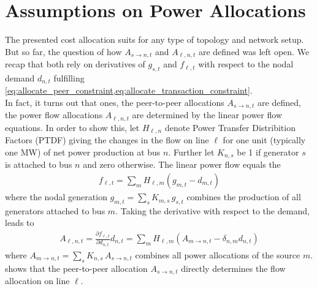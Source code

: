 \documentclass[11pt,twocolumn]{article}
\newcommand{\pdv}[2]{\frac{\partial #1}{\partial #2}}
\newcommand{\generation}{g_{s,t}}
\newcommand{\nodalgeneration}[1][n]{g_{#1,t}}
\newcommand{\demand}[1][n]{d_{#1,t}}
\newcommand{\incidencegenerator}[1][n]{K_{#1,s}}
\newcommand{\ptdf}[1][n]{H_{\ell,#1}}
\newcommand{\flow}{f_{\ell,t}}
\newcommand{\allocatepeer}[1][s \rightarrow n]{A_{#1,t}}
\newcommand{\allocateflow}[1][n]{A_{\ell,#1,t}}
\begin{document}
\section{Assumptions on Power Allocations}
\label{sec:localizing_allocations}

The presented cost allocation suits for any type of topology and network setup. But so far, the question of how $\allocatepeer$ and $\allocateflow$ are defined was left open. We recap that both rely on derivatives of $\generation$ and $\flow$  with respect to the nodal demand $\demand$ fulfilling \cref{eq:allocate_peer_constraint,eq:allocate_transaction_constraint}. \\
% 
In fact, it turns out that ones, the peer-to-peer allocations $\allocatepeer$ are defined, the power flow allocations $\allocateflow$ are determined by the linear power flow equations.
In order to show this, let $\ptdf$ denote Power Transfer Distribition Factors (PTDF) giving the changes in the flow on line $\ell$ for one unit (typically one MW) of net power production at bus $n$.  Further let $\incidencegenerator$ be 1 if generator $s$ is attached to bus $n$ and zero otherwise. The linear power flow equals the 
\begin{align}
 \flow  = \sum_m \ptdf[m] \left( \nodalgeneration[m] - \demand[m] \right)  
\end{align}
where the nodal generation $\nodalgeneration[m] = \sum_s \incidencegenerator[m] \, \generation $ combines the production of all generators attached to bus $m$. Taking the derivative with respect to the demand, leads to 
\begin{align}
 \allocateflow = \pdv{\flow}{\demand} \demand = \sum_m \ptdf[m] \left( \allocatepeer[m \rightarrow n]  - \delta_{n,m} \demand \right) 
 \label{eq:allocate_peer_to_allocate_flow}
\end{align}
where $\allocatepeer[m \rightarrow n] = \sum_s \incidencegenerator \, \allocatepeer$ combines all power allocations of the source $m$.  shows that the peer-to-peer allocation $\allocatepeer$ directly determines the flow allocation on line $\ell$.
\end{document}
